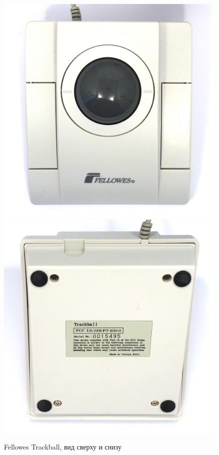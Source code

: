 \documentclass[11pt, a4paper]{article}
\begin{document}
\begin{figure}[h]
    \centering
    \includegraphics[scale=0.45]{1997_fellowes_trackball/top_60.jpg}
    \includegraphics[scale=0.45]{1997_fellowes_trackball/bottom_60.jpg}
    \caption{Fellowes Trackball, вид сверху и снизу}
    \label{fig:FellowesTrackballTopBottom}
\end{figure}
\end{document}
